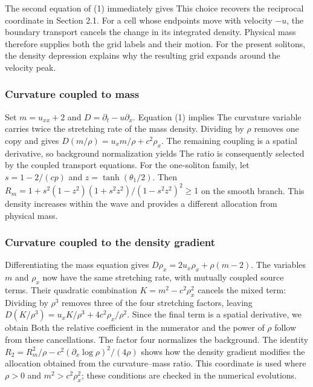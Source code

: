 The second equation of (1) immediately gives
This choice recovers the reciprocal coordinate in Section 2.1. For a cell whose endpoints move with velocity \(-u\), the boundary transport cancels the change in its integrated density. Physical mass therefore supplies both the grid labels and their motion. For the present solitons, the density depression explains why the resulting grid expands around the velocity peak.

\subsubsection*{Curvature coupled to mass}

Set \(m=u_{xx}+2\) and \(D=\partial_t-u\partial_x\). Equation (1) implies
The curvature variable carries twice the stretching rate of the mass density. Dividing by \(\rho\) removes one copy and gives \(D(m/\rho)=u_xm/\rho+c^2\rho_x\). The remaining coupling is a spatial derivative, so background normalization yields
The ratio is consequently selected by the coupled transport equations. For the one-soliton family, let \(s=1-2/(cp)\) and \(z=\tanh(\theta_1/2)\). Then \(R_m=1+s^2(1-z^2)(1+s^2z^2)/(1-s^2z^2)^2\geq1\) on the smooth branch. This density increases within the wave and provides a different allocation from physical mass.

\subsubsection*{Curvature coupled to the density gradient}

Differentiating the mass equation gives \(D\rho_x=2u_x\rho_x+\rho(m-2)\). The variables \(m\) and \(\rho_x\) now have the same stretching rate, with mutually coupled source terms. Their quadratic combination \(K=m^2-c^2\rho_x^2\) cancels the mixed term:
Dividing by \(\rho^3\) removes three of the four stretching factors, leaving \(D(K/\rho^3)=u_xK/\rho^3+4c^2\rho_x/\rho^2\). Since the final term is a spatial derivative, we obtain
Both the relative coefficient in the numerator and the power of \(\rho\) follow from these cancellations. The factor four normalizes the background. The identity \(R_2=R_m^2/\rho-c^2(\partial_x\log\rho)^2/(4\rho)\) shows how the density gradient modifies the allocation obtained from the curvature--mass ratio. This coordinate is used where \(\rho>0\) and \(m^2>c^2\rho_x^2\); these conditions are checked in the numerical evolutions.

